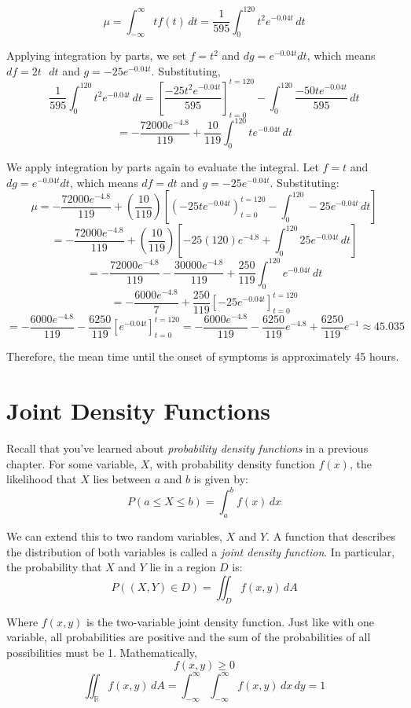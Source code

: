 \begin{Answer}[ref = symptoms]
$$\mu = \int_{-\infty}^{\infty} tf(t)\,dt = \frac{1}{595} \int_{0}^{120} t^2 
e^{-0.04t}\,dt$$

Applying integration by parts, we set $f = t^2$ and $dg = e^{-0.04t}dt$, which 
means $df = 2t\text{ }dt$ and $g = -25e^{-0.04t}$. Substituting, 
$$\frac{1}{595} \int_{0}^{120} t^2 e^{-0.04t}\,dt = \left[ \frac{-25t^2 
e^{-0.04t}}{595} \right]_{t = 0}^{t = 120} - \int_{0}^{120} \frac{-50te^{-0.04t
}}{595}\,dt$$
$$= -\frac{72000 e^{-4.8}}{119} + \frac{10}{119} \int_0^{120} t e^{-0.04t}\,dt$$

We apply integration by parts again to evaluate the integral. Let $f = t$ and 
$dg = e^{-0.04t} dt$, which means $df = dt$ and $g = -25e^{-0.04t}$. 
Substituting:
$$\mu = -\frac{72000 e^{-4.8}}{119} + \left( \frac{10}{119} \right) \left[ 
\left( -25te^{-0.04t} \right)_{t = 0}^{t = 120} - \int_0^{120} -25e^{-0.04t}
\,dt \right]$$
$$= -\frac{72000e^{-4.8}}{119} + \left( \frac{10}{119} \right) \left[ -25(120)
e^{-4.8} + \int_0^{120} 25e^{-0.04t}\,dt \right]$$
$$= -\frac{72000e^{-4.8}}{119} - \frac{30000e^{-4.8}}{119} + \frac{250}{119} 
\int_0^{120} e^{-0.04t}\,dt$$
$$= -\frac{6000e^{-4.8}}{7} + \frac{250}{119} \left[ -25e^{-0.04t} \right]_{
t = 0}^{t = 120}$$
$$= -\frac{6000 e^{-4.8}}{119} - \frac{6250}{119} \left[e^{-0.04t} \right]_{
t = 0}^{t = 120} = -\frac{6000e^{-4.8}}{119} - \frac{6250}{119}e^{-4.8} + 
\frac{6250}{119}e^{-1} \approx 45.035$$

Therefore, the mean time until the onset of symptoms is approximately 45 hours. 
\end{Answer}

\section{Joint Density Functions}
Recall that you've learned about \textit{probability density functions} in a 
previous chapter. For some variable, $X$, with probability density function 
$f(x)$, the likelihood that $X$ lies between $a$ and $b$ is given by:
$$P(a \leq X \leq b) = \int_a^b f(x)\,dx$$

We can extend this to two random variables, $X$ and $Y$. A function that 
describes the distribution of both variables is called a \textit{joint 
density function}. In particular, the probability
that $X$ and $Y$ lie in a region $D$ is:
$$P((X, Y) \in D) = \iint_{\textit{D}} f(x,y)\,dA$$

Where $f(x, y)$ is the two-variable joint density function. Just like with one 
variable, all probabilities are positive and the sum of the probabilities of 
all possibilities must be 1. Mathematically, 
$$f(x, y) \geq 0$$
$$\iint_{\mathbb{R}} f(x, y)\,dA = \int_{-\infty}^{\infty} \int_{-\infty}^{
\infty} f(x, y)\,dx\,dy = 1$$

